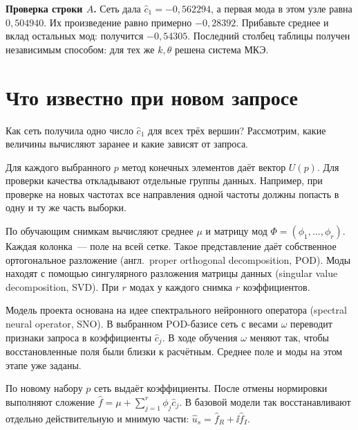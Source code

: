 \textbf{Проверка строки $A$.} Сеть дала $\widehat c_1=-0{,}562294$,
а первая мода в этом узле равна $0{,}504940$. Их произведение
равно примерно $-0{,}28392$. Прибавьте среднее и вклад остальных мод:
получится $-0{,}54305$. Последний столбец таблицы получен независимым
способом: для тех же $k,\theta$ решена система МКЭ.

\clearpage
\section{Что известно при новом запросе}
\label{primer:stages}\label{primer:why-svd}
Как сеть получила одно число $\widehat c_1$ для всех трёх вершин?
Рассмотрим, какие величины вычисляют заранее и какие зависят от запроса.

\smallskip{}\par\nopagebreak[4]
Для каждого выбранного $p$ метод конечных элементов даёт вектор $U(p)$.
Для проверки качества откладывают отдельные группы данных. Например, при
проверке на новых частотах все направления одной частоты должны попасть
в одну и ту же часть выборки.
\smallskip{}\par\nopagebreak[4]
По обучающим снимкам вычисляют среднее $\mu$ и матрицу мод
$\Phi=(\phi_1,\ldots,\phi_r)$. Каждая колонка~--- поле на всей сетке.
Такое представление даёт собственное ортогональное разложение
(англ.\ proper orthogonal decomposition, POD). Моды находят с помощью
сингулярного разложения матрицы данных (singular value decomposition, SVD).
При $r$ модах у каждого снимка $r$ коэффициентов.
\smallskip{}\par\nopagebreak[4]
Модель проекта основана на идее спектрального нейронного оператора
(spectral neural operator, SNO). В выбранном POD-базисе сеть с весами
$\omega$ переводит признаки запроса в коэффициенты
$\widehat c_j$. В ходе обучения $\omega$ меняют так, чтобы восстановленные
поля были близки к расчётным. Среднее поле и моды на этом этапе уже заданы.
\smallskip{}\par\nopagebreak[4]
По новому набору $p$ сеть выдаёт коэффициенты. После отмены нормировки
выполняют сложение $\widehat f=\mu+\sum_{j=1}^r\phi_j\widehat c_j$.
В базовой модели так восстанавливают отдельно действительную и мнимую части:
$\widehat u_s=\widehat f_R+\ii\widehat f_I$.


